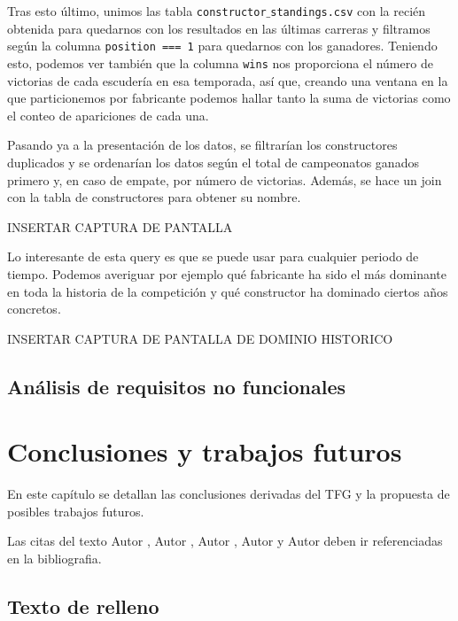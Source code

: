 \documentclass[12pt,twoside,titlepage]{report}
\begin{document}
Tras esto último, unimos las tabla \texttt{constructor$\_$standings.csv} con la recién obtenida para quedarnos con los resultados en las últimas carreras y filtramos según la columna \texttt{position === 1} para quedarnos con los ganadores. Teniendo esto, podemos ver también que la columna \texttt{wins} nos proporciona el número de victorias de cada escudería en esa temporada, así que, creando una ventana en la que particionemos por fabricante podemos hallar tanto la suma de victorias como el conteo de apariciones de cada una. 

Pasando ya a la presentación de los datos, se filtrarían los constructores duplicados y se ordenarían los datos según el total de campeonatos ganados primero y, en caso de empate, por número de victorias. Además, se hace un join con la tabla de constructores para obtener su nombre.

INSERTAR CAPTURA DE PANTALLA

Lo interesante de esta query es que se puede usar para cualquier periodo de tiempo. Podemos averiguar por ejemplo qué fabricante ha sido el más dominante en toda la historia de la competición y qué constructor ha dominado ciertos años concretos.

INSERTAR CAPTURA DE PANTALLA DE DOMINIO HISTORICO



\section{Análisis de requisitos no funcionales}







\chapter{Conclusiones y trabajos futuros}

En este capítulo se detallan las conclusiones derivadas del TFG y la propuesta de posibles trabajos futuros.

Las citas del texto Autor \cite{giaquinta}, Autor \cite{fortune}, Autor \cite{fortuneB}, Autor \cite{mitchell} y Autor \cite{morrey} deben ir referenciadas en la bibliografia.


\section{Texto de relleno}
\end{document}
